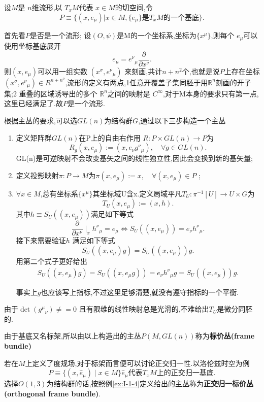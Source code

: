 \documentclass[../main.tex]{subfiles}
\begin{document}
 \begin{example}
   \label{ex:I-1-4}
   设$M$是 $n$维流形,以 $T_xM$代表 $x\in M$的切空间,令\[
 P \equiv \{(x,e_\mu)| x \in  M, \{e_\mu\} \text{是}T_xM\text{的一个基底}\}
   .\]

   首先看$P$是否是一个流形;
   设$(O,\psi)$是M的一个坐标系,坐标为$\{x^\mu\}$,则每个 $e_\mu$可以使用坐标基底展开 \[
  e_\mu = e^{\nu}{}_{\mu} \frac{\partial }{\partial x^\nu}  
   .\] 
   则$(x,e_\mu)$可以用一组实数 $(x^\sigma,e^{\nu}{}_{\mu})$ 来刻画,共计$n + n^2$个,也就是说$P$上存在坐标
   $(x^\sigma,e^{\nu}{}_{\mu}) \in  R^{n + n^2}$,流形的定义有两点,1任意开覆盖子集同胚于用$\mathbb{R}^n$刻画的开子集;2
   重叠的区域诱导出的多个 $\mathbb{R}^n$之间的映射是 $C^\infty$,对于M本身的要求只有第一点,
   这里已经满足了.故$P$是一个流形.

   根据主丛的要求,可以选$GL(n)$为结构群$G$,通过以下三步构造一个主丛
   \begin{enumerate}
     \item 定义矩阵群$GL(n)$在P上的自由右作用 $R:P \times GL(n) \to P$为\[
         R_g(x,e_\mu) := (x,e_\nu g^{\nu}{}_{\mu}), \quad \forall g \in GL(n) 
     .\]
     GL(n)是可逆映射不会改变基矢之间的线性独立性,因此会变换到新的基矢量;
   \item 定义投影映射$\pi : P \to M$为$\pi(x,e_\mu) := x, \quad \forall (x,e_\mu) \in  P$ ;
   \item $\forall x \in M$,总有坐标系$\{x^\mu\}$其坐标域U含x.定义局域平凡$T_U : \pi^{-1} [U] \to  U \times G$为 \[
      T_U(x,e_\mu):= (x,h)
       .\]
     其中$h \equiv S_U((x,e_\mu))$满足如下等式 \[
    \frac{\partial   }{\partial x^\nu} \mid _x h^{\nu}{}_{\mu} = e_\mu \Leftrightarrow S_U((x,e_\mu)) = e_\nu h^{\nu}{}_{\mu}
     .\]
     接下来需要验证$h$ 满足如下等式\[
    S_U((x,e_\mu)g ) = S_U((x,e_\mu))g 
     .\] 
     用第二个式子更好给出
     \begin{align*}
      S_U((x,e_\mu)g) = S_U((x,e_\mu g)) = e_\nu h^{\nu}{}_{\mu}g = S_U((x,e_\mu))g
     .\end{align*}
     \begin{note}
       事实上$g$也应该写上指标,不过这里足够清楚,就没有遵守指标的一个平衡.
     \end{note}
   \end{enumerate}
   由于$\det(g^{\mu}{}_{\nu}) \neq = 0$ 且有限维的线性映射总是光滑的,不难给出$T_U$是微分同胚的.
 \end{example}

 由于基底又名标架,所以由以上构造出的主丛$P(M,GL(n))$称为\textbf{标价丛(frame bundle)}
 \begin{example}
 \label{ex:I-1-5}
 若在$M$上定义了度规场,对于标架而言便可以讨论正交归一性.以洛伦兹时空为例 \[
   P \equiv \{(x, \hat{e}_\mu)  \mid x \in M\} \hat{e}_\mu\text{代表}T_xM\text{上的正交归一基底} 
 .\] 
 选择$O(1,3)$为结构群的话,按照例\ref{ex:I-1-4}定义给出的主丛称为\textbf{正交归一标价丛(orthogonal frame bundle)}.

 \end{example}
\end{document}
